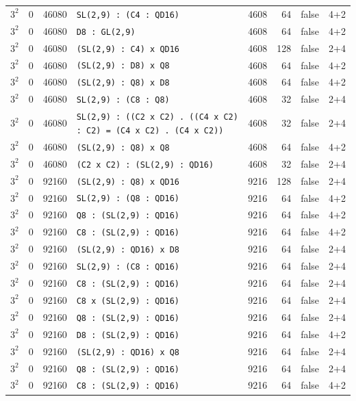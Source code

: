 \begin{longtable}{llrlrrll}
$3^2$ & 0 & 46080 & \texttt{SL(2,9) : (C4 : QD16)} & 4608 & 64 & false & 4+2\\
$3^2$ & 0 & 46080 & \texttt{D8 : GL(2,9)} & 4608 & 64 & false & 4+2\\
$3^2$ & 0 & 46080 & \texttt{(SL(2,9) : C4) x QD16} & 4608 & 128 & false & 2+4\\
$3^2$ & 0 & 46080 & \texttt{(SL(2,9) : D8) x Q8} & 4608 & 64 & false & 4+2\\
$3^2$ & 0 & 46080 & \texttt{(SL(2,9) : Q8) x D8} & 4608 & 64 & false & 4+2\\
$3^2$ & 0 & 46080 & \texttt{SL(2,9) : (C8 : Q8)} & 4608 & 32 & false & 2+4\\
$3^2$ & 0 & 46080 & \texttt{SL(2,9) : ((C2 x C2) . ((C4 x C2) : C2) = (C4 x C2) . (C4 x C2))} & 4608 & 32 & false & 2+4\\
$3^2$ & 0 & 46080 & \texttt{(SL(2,9) : Q8) x Q8} & 4608 & 64 & false & 4+2\\
$3^2$ & 0 & 46080 & \texttt{(C2 x C2) : (SL(2,9) : QD16)} & 4608 & 32 & false & 2+4\\
$3^2$ & 0 & 92160 & \texttt{(SL(2,9) : Q8) x QD16} & 9216 & 128 & false & 2+4\\
$3^2$ & 0 & 92160 & \texttt{SL(2,9) : (Q8 : QD16)} & 9216 & 64 & false & 4+2\\
$3^2$ & 0 & 92160 & \texttt{Q8 : (SL(2,9) : QD16)} & 9216 & 64 & false & 4+2\\
$3^2$ & 0 & 92160 & \texttt{C8 : (SL(2,9) : QD16)} & 9216 & 64 & false & 4+2\\
$3^2$ & 0 & 92160 & \texttt{(SL(2,9) : QD16) x D8} & 9216 & 64 & false & 2+4\\
$3^2$ & 0 & 92160 & \texttt{SL(2,9) : (C8 : QD16)} & 9216 & 64 & false & 2+4\\
$3^2$ & 0 & 92160 & \texttt{C8 : (SL(2,9) : QD16)} & 9216 & 64 & false & 2+4\\
$3^2$ & 0 & 92160 & \texttt{C8 x (SL(2,9) : QD16)} & 9216 & 64 & false & 2+4\\
$3^2$ & 0 & 92160 & \texttt{Q8 : (SL(2,9) : QD16)} & 9216 & 64 & false & 2+4\\
$3^2$ & 0 & 92160 & \texttt{D8 : (SL(2,9) : QD16)} & 9216 & 64 & false & 4+2\\
$3^2$ & 0 & 92160 & \texttt{(SL(2,9) : QD16) x Q8} & 9216 & 64 & false & 2+4\\
$3^2$ & 0 & 92160 & \texttt{Q8 : (SL(2,9) : QD16)} & 9216 & 64 & false & 2+4\\
$3^2$ & 0 & 92160 & \texttt{C8 : (SL(2,9) : QD16)} & 9216 & 64 & false & 4+2\\

\end{longtable}
